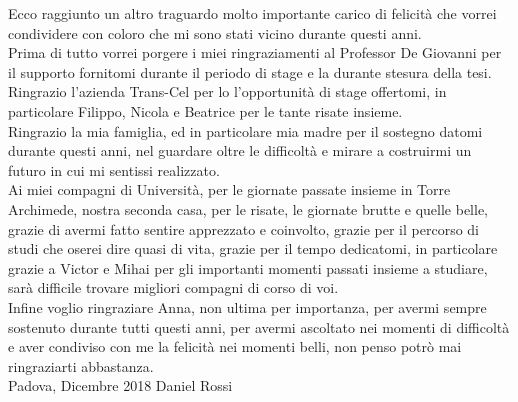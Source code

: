 
Ecco raggiunto un altro traguardo molto importante carico di felicità che vorrei condividere con coloro che mi sono stati vicino durante questi anni.\\
\newline
Prima di tutto vorrei porgere i miei ringraziamenti al Professor De Giovanni per il supporto fornitomi durante il periodo di stage e la durante stesura della tesi.\\
\newline
Ringrazio l'azienda Trans-Cel per lo l'opportunità di stage offertomi, in particolare Filippo, Nicola e Beatrice per le tante risate insieme.\\
\newline
Ringrazio la mia famiglia, ed in particolare mia madre per il sostegno datomi durante questi anni, nel guardare oltre le difficoltà e mirare a costruirmi un futuro in cui mi sentissi realizzato.\\
\newline
Ai miei compagni di Università, per le giornate passate insieme in Torre Archimede, nostra seconda casa, per le risate, le giornate brutte e quelle belle, grazie di avermi fatto sentire apprezzato e coinvolto, grazie per il percorso di studi che oserei dire quasi di vita, grazie per il tempo dedicatomi, in particolare grazie a Victor e Mihai per gli importanti momenti passati insieme a studiare, sarà difficile trovare migliori compagni di corso di voi.\\
\newline
Infine voglio ringraziare Anna, non ultima per importanza, per avermi sempre sostenuto durante tutti questi anni, per avermi ascoltato nei momenti di difficoltà e aver condiviso con me la felicità nei momenti belli, non penso potrò mai ringraziarti abbastanza.\\
\newline
Padova, Dicembre 2018 \hfill Daniel Rossi
